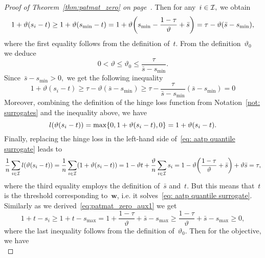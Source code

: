 \begin{proof}[Proof of Theorem~\ref{thm:patmat_zero} on page~\pageref{thm:patmat_zero}]
  Then for any~$i \in \mathcal{I},$ we obtain 
  \begin{equation*}
    1 + \vartheta(s_i - t)
      \geq 1 + \vartheta(s_{\min} - t)
      = 1 + \vartheta \Brac{s_{\min} - \frac{1 - \tau}{\vartheta} + \bar{s}}
      = \tau - \vartheta (\bar{s} - s_{\min}),
  \end{equation*}
  where the first equality follows from the definition of~$t.$ From the definition~$\vartheta_0$ we deduce
  \begin{equation*}
    0 < \vartheta \leq \vartheta_0 \leq \frac{\tau}{\bar{s} - s_{\min}}.
  \end{equation*}
  Since~$\bar{s} - s_{\min} > 0,$ we get the following inequality
  \begin{equation}\label{eq:patmat_zero_aux1}
    1 + \vartheta(s_i - t)
      \geq \tau - \vartheta (\bar{s} - s_{\min})
      \geq \tau - \frac{\tau}{\bar{s} - s_{\min}} (\bar{s} - s_{\min})
      = 0
  \end{equation}
  Moreover, combining the definition of the hinge loss function from Notation~\ref{not: surrogates} and the inequality above, we have
  \begin{equation*}
    l\Brac{\vartheta (s_i - t)}
      = \max\{0, 1 + \vartheta (s_i - t), 0\}
      = 1 + \vartheta(s_i - t).
  \end{equation*}
  Finally, replacing the hinge loss in the left-hand side of~\eqref{eq: aatp quantile surrogate} leads to
  \begin{equation*}
    \frac{1}{n} \sum_{i \in \I} l\Brac{\vartheta (s_i - t)}
      = \frac{1}{n}\sum_{i \in \I}\Brac{1 + \vartheta(s_i - t)}
      = 1 - \vartheta t + \frac{\vartheta}{n} \sum_{i \in \I} s_i
      = 1 - \vartheta \Brac{\frac{1 - \tau}{\vartheta} + \bar{s}} + \vartheta \bar{s}
      = \tau,
  \end{equation*}
  where the third equality employs the definition of~$\bar{s}$ and~$t$. But this means that~$t$ is the threshold corresponding to~$\bm{w}$, i.e. it solves~\eqref{eq: aatp quantile surrogate}. Similarly as we derived~\eqref{eq:patmat_zero_aux1} we get
  \begin{equation}\label{eq:patmat_zero_aux2}
    1 + t - s_i
    \geq 1 + t-s_{\max}
    =   1 + \frac{1-\tau}{\vartheta} + \bar{s} - s_{\max}
    \geq \frac{1-\tau}{\vartheta} + \bar{s} - s_{\max}
    \geq 0,
  \end{equation}
  where the last inequality follows from the definition of~$\vartheta_0$. Then for the objective, we have
  \begin{equation*}

\end{equation*}
\end{proof}
